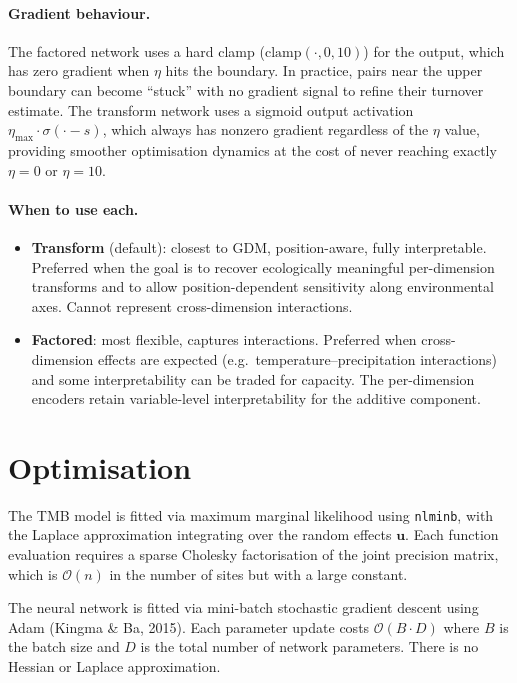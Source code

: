 \documentclass{article}
\begin{document}
\paragraph{Gradient behaviour.}
The factored network uses a hard clamp ($\text{clamp}(\cdot, 0, 10)$) for the output, which has zero gradient when $\eta$ hits the boundary. In practice, pairs near the upper boundary can become ``stuck'' with no gradient signal to refine their turnover estimate. The transform network uses a sigmoid output activation $\eta_{\max} \cdot \sigma(\cdot - s)$, which always has nonzero gradient regardless of the $\eta$ value, providing smoother optimisation dynamics at the cost of never reaching exactly $\eta = 0$ or $\eta = 10$.

\paragraph{When to use each.}
\begin{itemize}
    \item \textbf{Transform} (default): closest to GDM, position-aware, fully interpretable. Preferred when the goal is to recover ecologically meaningful per-dimension transforms and to allow position-dependent sensitivity along environmental axes. Cannot represent cross-dimension interactions.
    \item \textbf{Factored}: most flexible, captures interactions. Preferred when cross-dimension effects are expected (e.g.\ temperature--precipitation interactions) and some interpretability can be traded for capacity. The per-dimension encoders retain variable-level interpretability for the additive component.
\end{itemize}

\section{Optimisation}

The TMB model is fitted via maximum marginal likelihood using \texttt{nlminb}, with the Laplace approximation integrating over the random effects $\mathbf{u}$. Each function evaluation requires a sparse Cholesky factorisation of the joint precision matrix, which is $\mathcal{O}(n)$ in the number of sites but with a large constant.

The neural network is fitted via mini-batch stochastic gradient descent using Adam (Kingma \& Ba, 2015). Each parameter update costs $\mathcal{O}(B \cdot D)$ where $B$ is the batch size and $D$ is the total number of network parameters. There is no Hessian or Laplace approximation.
\end{document}
